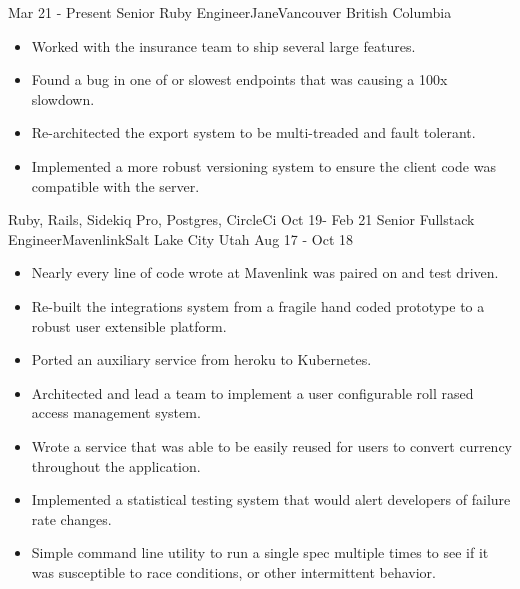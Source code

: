 %
%
%

\begin{experiences}
  \experience
    {Mar 21 - Present}   {Senior Ruby Engineer}{Jane}{Vancouver British Columbia}
    {} {
        \begin{itemize}
          \item Worked with the insurance team to ship several large features.
          \item Found a bug in one of or slowest endpoints that was causing a 100x slowdown.
          \item Re-architected the export system to be multi-treaded and fault tolerant. 
          \item Implemented a more robust versioning system to ensure the client code was compatible with the server.
        \end{itemize}
      }
      {Ruby, Rails, Sidekiq Pro, Postgres, CircleCi}
  \emptySeparator
  \experience
    {Oct 19- Feb 21} {Senior Fullstack Engineer}{Mavenlink}{Salt Lake City Utah}
    {Aug 17 - Oct 18} {
                      \begin{itemize}
                        \item Nearly every line of code wrote at Mavenlink was paired on and test driven.
                        \item Re-built the integrations system from a fragile hand coded prototype to a robust user extensible platform.
                        \item Ported an auxiliary service from heroku to Kubernetes.
                        \item Architected and lead a team to implement a user configurable roll rased access management system. 
                        \item Wrote a service that was able to be easily reused for users to convert currency throughout the application.
                        \item Implemented a statistical testing system that would alert developers of failure rate changes.
                        \item Simple command line utility to run a single spec multiple times to see if it was susceptible to race conditions, or other intermittent behavior.

\end{itemize}}
\end{experiences}
